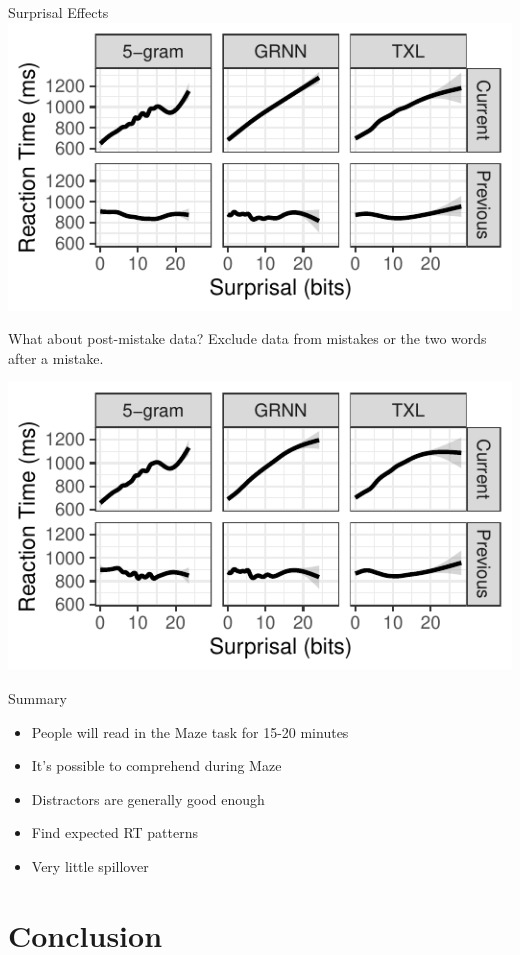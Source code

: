 \documentclass[12pt, xcolor=beamer,table,usenames,dvipsnames, ignorenonframetext, ngerman]{beamer}
\begin{document}
\begin{frame}{Surprisal Effects}
\includegraphics[width=.9\textwidth]{gam.pdf}	
\end{frame}
\begin{frame}{What about post-mistake data?}
Exclude data from mistakes or the two words after a mistake. 

\includegraphics[width=.9\textwidth]{gam2.pdf}	
\end{frame}

\begin{frame}{Summary}
\begin{itemize}\pause
	\item People will read in the Maze task for 15-20 minutes \pause
	\item It's possible to comprehend during Maze \pause
	\item Distractors are generally good enough \pause
	\item Find expected RT patterns \pause
	\item Very little spillover
\end{itemize}
\end{frame}
\section{Conclusion}
\end{document}
